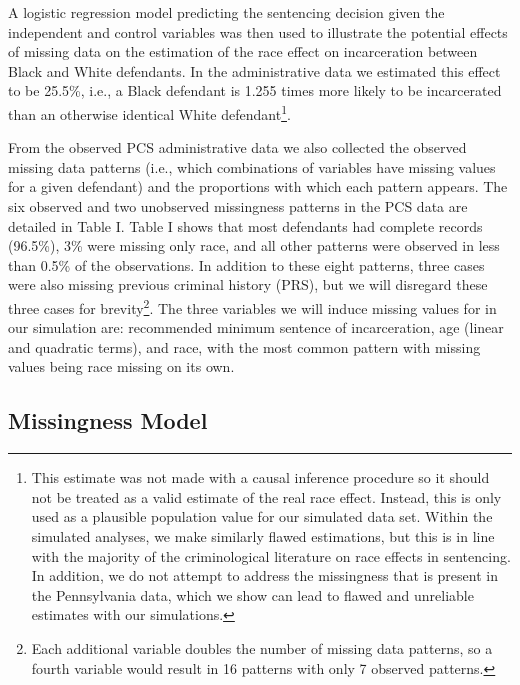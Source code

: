 \documentclass[titlepage]{article}
\begin{document}
A logistic regression model predicting the sentencing decision given the independent and control variables was then used to illustrate the potential effects of missing data on the estimation of the race effect on incarceration between Black and White defendants. In the administrative data we estimated this effect to be 25.5\%, i.e., a Black defendant is 1.255 times more likely to be incarcerated than an otherwise identical White defendant\footnote{This estimate was not made with a causal inference procedure so it should not be treated as a valid estimate of the real race effect. Instead, this is only used as a plausible population value for our simulated data set. Within the simulated analyses, we make similarly flawed estimations, but this is in line with the majority of the criminological literature on race effects in sentencing. In addition, we do not attempt to address the missingness that is present in the Pennsylvania data, which we show can lead to flawed and unreliable estimates with our simulations.}. 

From the observed PCS administrative data we also collected the observed missing data patterns (i.e., which combinations of variables have missing values for a given defendant) and the proportions with which each pattern appears. The six observed and two unobserved missingness patterns in the PCS data are detailed in Table I. Table I shows that most defendants had complete records (96.5\%), 3\% were missing only race, and all other patterns were observed in less than 0.5\% of the observations. In addition to these eight patterns, three cases were also missing previous criminal history (PRS), but we will disregard these three cases for brevity\footnote{Each additional variable doubles the number of missing data patterns, so a fourth variable would result in 16 patterns with only 7 observed patterns.}.  The three variables we will induce missing values for in our simulation are: recommended minimum sentence of incarceration, age (linear and quadratic terms), and race, with the most common pattern with missing values being race missing on its own.

\subsection{Missingness Model}
\end{document}
